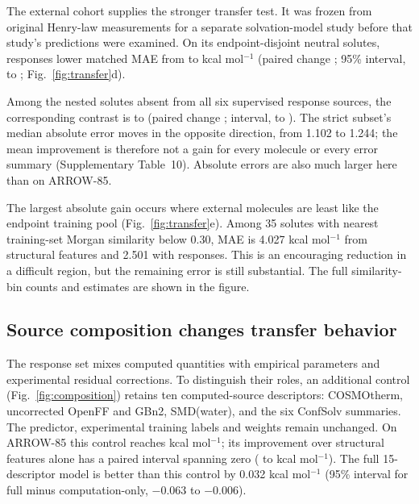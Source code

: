 \documentclass[12pt]{article}
\begin{document}
The external cohort supplies the stronger transfer test. It was frozen from
original Henry-law measurements for a separate solvation-model study before
that study's predictions were examined.\cite{sander2023} On its \TierAN{} endpoint-disjoint neutral
solutes, responses lower matched MAE from \TierAStructureMAE{} to
\TierASolvAIMAE{} kcal mol$^{-1}$ (paired change \TierADelta{}; 95\% interval,
\TierACILow{} to \TierACIHigh{}; Fig.~\ref{fig:transfer}d).

Among the nested
\TierAStrictN{} solutes absent from all six supervised response sources, the
corresponding contrast is \TierAStrictStructureMAE{} to
\TierAStrictSolvAIMAE{} (paired change \TierAStrictDelta{}; interval,
\TierAStrictCILow{} to \TierAStrictCIHigh{}). The strict subset's median absolute
error moves in the opposite direction, from 1.102 to 1.244; the mean improvement
is therefore not a gain for every molecule or every error summary
(Supplementary Table~10). Absolute errors are also much larger here than on
ARROW-85.

The largest absolute gain occurs where external molecules are least like the
endpoint training pool (Fig.~\ref{fig:transfer}e). Among 35 solutes with nearest
training-set Morgan similarity below 0.30, MAE is 4.027 kcal mol$^{-1}$ from
structural features and 2.501 with responses. This is an encouraging reduction
in a difficult region, but the remaining error is still substantial. The full
similarity-bin counts and estimates are shown in the figure.


\FloatBarrier



\subsection*{Source composition changes transfer behavior}

\begingroup
{}
The response set mixes computed quantities with empirical parameters and experimental
residual corrections. To distinguish their roles, an additional control (Fig.~\ref{fig:composition}) retains ten
computed-source descriptors: COSMOtherm, uncorrected OpenFF and GBn2, SMD(water), and
the six ConfSolv summaries. The predictor, experimental training labels and weights
remain unchanged. On ARROW-85 this control reaches \ComputedOnlyMAE{} kcal mol$^{-1}$;
its improvement over structural features alone has a paired interval spanning zero
(\ComputedOnlyLow{} to \ComputedOnlyHigh{} kcal mol$^{-1}$). The full 15-descriptor
model is better than this control by 0.032 kcal mol$^{-1}$ (95\% interval for full
minus computation-only, $-0.063$ to $-0.006$).
\par\endgroup
\end{document}
